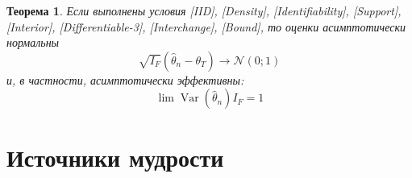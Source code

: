 \documentclass[12pt, a4paper]{article}
\DeclareMathOperator{\Var}{Var}
\newcommand{\cN}{\mathcal{N}}
\newtheorem{theorem}{Теорема}
\begin{document}
\begin{theorem}
  Если выполнены условия [IID], [Density], [Identifiability], [Support], [Interior], [Differentiable-3], [Interchange], [Bound], то 
  оценки асимптотически нормальны
  \[
     \sqrt{I_F} (\hat\theta_n - \theta_T) \to \cN(0;1)
  \]
  и, в частности, асимптотически эффективны:
  \[
  \lim \Var(\hat \theta_n) I_F = 1  
  \]
\end{theorem}


\section*{Источники мудрости}


\printbibliography[heading=none]
\end{document}
